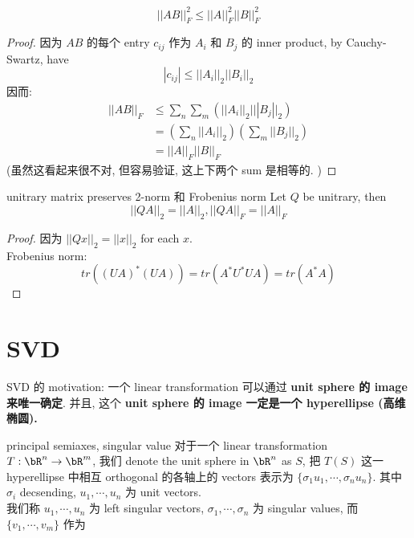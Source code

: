 \documentclass[lang=cn,11pt]{elegantbook}
\begin{document}
\begin{proposition}
    \begin{equation}
        ||AB||^2_F \leq ||A||^2_F ||B||^2_F
    \end{equation}
\end{proposition}
\begin{proof}
    因为 $AB$ 的每个 entry $c_{ij}$ 作为 $A_i$ 和 $B_j$ 的 inner product, by Cauchy-Swartz, have 
    $$
    |c_{ij}| \leq ||A_i||_2 ||B_i||_2
    $$
因而:
\begin{align}
    ||AB||_F  &\leq \sum_n \sum_m (||A_i||_2 |||B_j||_2) \\ 
    & = (\sum_n ||A_i||_2)(\sum_m ||B_j||_2) \\
    & = ||A||_F ||B||_F
\end{align}
(虽然这看起来很不对, 但容易验证, 这上下两个 sum 是相等的. )
\end{proof}

\begin{theorem}{unitrary matrix preserves 2-norm 和 Frobenius norm}
    Let $Q $ be unitrary, then
    $$
    ||QA||_2 = ||A||_2, ||QA||_F = ||A||_F
    $$
\end{theorem}
\begin{proof}
    因为 $||Qx||_2 = ||x||_2$ for each $x$. \\
    Frobenius norm: 
    $$
    tr((UA)^*(UA) ) = tr(A^*U^*UA) = tr(A^*A) 
    $$
\end{proof}







\chapter{SVD}
SVD 的 motivation: 一个 linear transformation 可以通过 \textbf{unit sphere 的 image 来唯一确定}. 并且, 这个 \textbf{unit sphere 的 image 一定是一个 hyperellipse (高维椭圆).}

\begin{definition}{principal semiaxes, singular value}
对于一个 linear transformation $T: \bR^n \rar \bR^m$, 我们 denote the unit sphere in $\bR^n$ as $S$, 把 $T(S)$ 这一 hyperellipse 中相互 orthogonal 的各轴上的 vectors 表示为 $\{  \sigma_1 u_1, \cdots, \sigma_nu_n    \}$. 其中 $\sigma_i$ decsending, $u_1,\cdots,u_n$ 为 unit vectors. \\
我们称 $u_1,\cdots,u_n$  为 left singular vectors, $\sigma_1, \cdots, \sigma_n$ 为 singular values, 而 $\{v_1,\cdots,v_m\}$ 作为
    
\end{definition}
\end{document}
